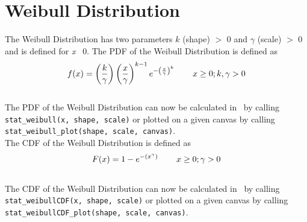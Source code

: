 	\section{Weibull Distribution}
	
		The Weibull Distribution has two parameters $k$ (shape) $>$ 0 and $\gamma$ (scale) $>$ 0 and is defined for \textit{x} \geq\ 0. The \ac{PDF} of the Weibull Distribution is defined as
		\\[0.3cm]
		$$f(x) = \left(\frac{k}{\gamma}\right)\left(\frac{x}{\gamma}\right)^{k-1}e^{-\left(\frac{x}{\gamma}\right)^{k}} \hspace{.3in} x \geq 0; k,\gamma > 0\\$$
		\\[0.3cm]
		The \ac{PDF} of the Weibull Distribution can now be calculated in \setlx\ by calling \lstinline{stat_weibull(x, shape, scale)} or plotted on a given canvas by calling \lstinline{stat_weibull_plot(shape, scale, canvas)}.
		\\[0.3cm]
		The \ac{CDF} of the Weibull Distribution is defined as
		\\[0.3cm]
		$$F(x) = 1 - e^{-(x^{\gamma})} \hspace{.3in} x \geq 0; \gamma > 0$$
		\\[0.3cm]
		The \ac{CDF} of the Weibull Distribution can now be calculated in \setlx\ by calling \lstinline{stat_weibullCDF(x, shape, scale)} or plotted on a given canvas by calling \lstinline{stat_weibullCDF_plot(shape, scale, canvas)}.
		